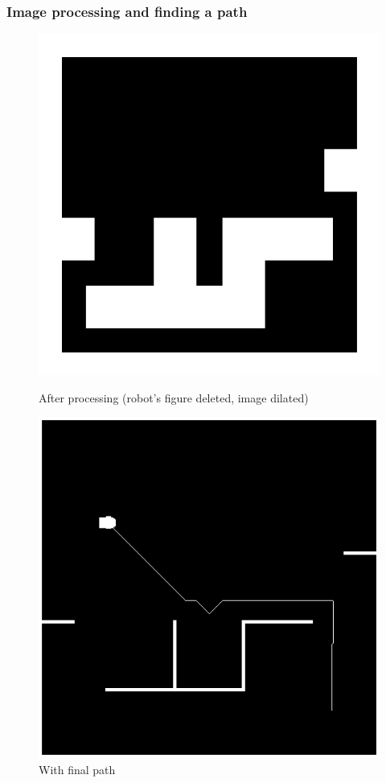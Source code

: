 \documentclass{beamer}
\begin{document}
	\begin{frame}
		\frametitle{Image processing and finding a path}
	\begin{figure}
		\centering
		\begin{minipage}[b]{0.4\textwidth}
			\includegraphics[scale=0.35]{dilated}
			\centering
			\caption{After processing (robot's figure deleted, image dilated)}
		\end{minipage}
		\hfill
		\begin{minipage}[b]{0.4\textwidth}
			\includegraphics[scale=0.35]{with_path}
			\centering
			\caption{With final path}
		\end{minipage}
	\end{figure}
	\end{frame}
	
\end{document}
